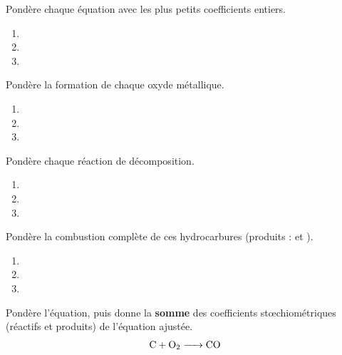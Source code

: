 \documentclass[11pt,a4paper]{article}
\begin{document}
\begin{exo}
Pondère chaque équation avec les plus petits coefficients entiers.
\begin{enumerate}[label=\alph*)]
  \item {}
  \item {}
  \item {}
\end{enumerate}
\end{exo}

\begin{exo}
Pondère la formation de chaque oxyde métallique.
\begin{enumerate}[label=\alph*)]
  \item {}
  \item {}
  \item {}
\end{enumerate}
\end{exo}

\begin{exo}[décompositions]
Pondère chaque réaction de décomposition.
\begin{enumerate}[label=\alph*)]
  \item {}
  \item {}
  \item {}
\end{enumerate}
\end{exo}

\begin{exo}
Pondère la combustion complète de ces hydrocarbures (produits :  et ).
\begin{enumerate}[label=\alph*)]
  \item {}
  \item {}
  \item {}
\end{enumerate}
\end{exo}

\begin{exo}
Pondère l'équation, puis donne la \textbf{somme} des coefficients stœchiométriques (réactifs et
produits) de l'équation ajustée.
\[
\ce{C + O2 -> CO}
\]
\end{exo}
\end{document}
